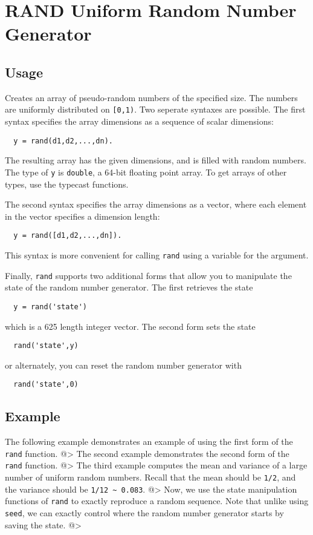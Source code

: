 \section{RAND Uniform Random Number Generator}

\subsection{Usage}

Creates an array of pseudo-random numbers of the specified size.
The numbers are uniformly distributed on \verb|[0,1)|.  
Two seperate syntaxes are possible.  The first syntax specifies the array 
dimensions as a sequence of scalar dimensions:
\begin{verbatim}
  y = rand(d1,d2,...,dn).
\end{verbatim}
The resulting array has the given dimensions, and is filled with
random numbers.  The type of \verb|y| is \verb|double|, a 64-bit floating
point array.  To get arrays of other types, use the typecast 
functions.
    
The second syntax specifies the array dimensions as a vector,
where each element in the vector specifies a dimension length:
\begin{verbatim}
  y = rand([d1,d2,...,dn]).
\end{verbatim}
This syntax is more convenient for calling \verb|rand| using a 
variable for the argument.

Finally, \verb|rand| supports two additional forms that allow
you to manipulate the state of the random number generator.
The first retrieves the state
\begin{verbatim}
  y = rand('state')
\end{verbatim}
which is a 625 length integer vector.  The second form sets
the state
\begin{verbatim}
  rand('state',y)
\end{verbatim}
or alternately, you can reset the random number generator with
\begin{verbatim}
  rand('state',0)
\end{verbatim}
\subsection{Example}

The following example demonstrates an example of using the first form of the \verb|rand| function.
@>
The second example demonstrates the second form of the \verb|rand| function.
@>
The third example computes the mean and variance of a large number of uniform random numbers.  Recall that the mean should be \verb|1/2|, and the variance should be \verb|1/12 ~ 0.083|.
@>
Now, we use the state manipulation functions of \verb|rand| to exactly reproduce 
a random sequence.  Note that unlike using \verb|seed|, we can exactly control where
the random number generator starts by saving the state.
@>
